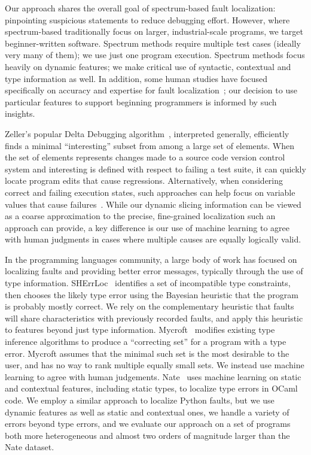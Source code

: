 \documentclass[conference]{IEEEtran}
\begin{document}
Our approach shares the overall goal of spectrum-based fault localization:
pinpointing suspicious statements to reduce debugging effort. However,
where spectrum-based traditionally focus on larger, industrial-scale
programs, we target beginner-written software. Spectrum methods require
multiple test cases (ideally very many of them); we use just one program
execution. Spectrum methods focus heavily on dynamic features; we make
critical use of syntactic, contextual and type information as well.
In addition, some human studies have focused specifically on accuracy and
expertise for fault localization~\cite{fry2010,Prabhakararao03,ruthruff05};
our decision to use particular features to support beginning programmers is
informed by such insights.

Zeller's popular Delta Debugging algorithm~\cite{zeller99}, interpreted
generally, efficiently finds a minimal ``interesting'' subset from among a
large set of elements. When the set of elements represents changes made to
a source code version control system and interesting is defined with
respect to failing a test suite, it can quickly locate program edits that
cause regressions. Alternatively, when considering correct and failing
execution states, such approaches can help focus on variable values that
cause failures~\cite{zeller05}. While our dynamic slicing information can
be viewed as a coarse approximation to the precise, fine-grained
localization such an approach can provide, a key difference is our use
of machine learning to agree with human judgments in cases where multiple
causes are equally logically valid.

In the programming languages community, a large body of work has focused on
localizing faults and providing better error messages, typically through
the use of type information. SHErrLoc~\cite{SHErrLoc} identifies a set of
incompatible type constraints, then chooses the likely type error using the
Bayesian heuristic that the program is probably mostly correct. We rely on the
complementary heuristic that faults will share characteristics
with previously recorded faults, and apply this heuristic to features beyond
just type information. Mycroft~\cite{MYCROFT-type-errors} modifies existing
type inference algorithms to produce a ``correcting set'' for a program with
a type error. Mycroft assumes that the minimal such set is the most
desirable to the user, and has no way to rank multiple equally
small sets. We instead use machine learning to agree with human judgements.
Nate~\cite{learning-to-blame} uses machine learning on static and contextual
features, including static types, to localize type errors in OCaml
code. We employ a similar approach to localize Python faults, but we use
dynamic features as well as static and contextual ones, we handle a
variety of errors beyond type errors, and we evaluate our approach on a set of
programs both more heterogeneous and almost two orders of magnitude larger than
the Nate dataset.
\end{document}

